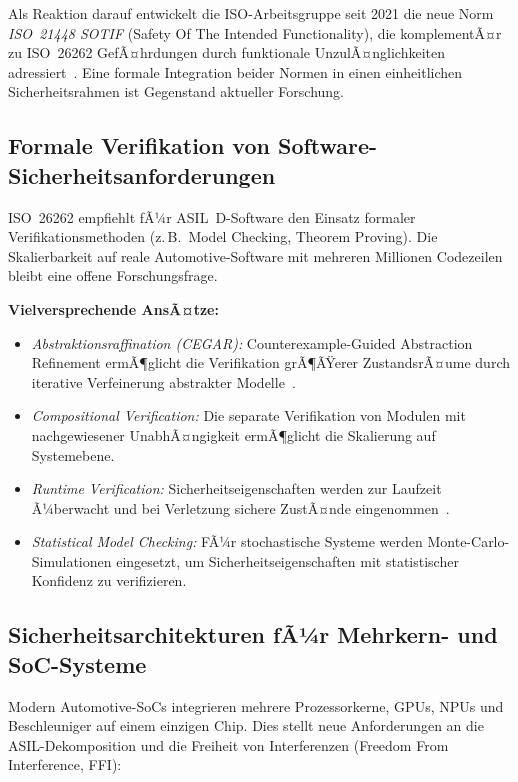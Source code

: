 ﻿\documentclass[a4paper,12pt]{article}
\theoremstyle{definition}
\begin{document}
Als Reaktion darauf entwickelt die ISO-Arbeitsgruppe seit 2021 die
neue Norm \emph{ISO~21448 SOTIF} (Safety Of The Intended
Functionality), die komplementÃ¤r zu ISO~26262 GefÃ¤hrdungen durch
funktionale UnzulÃ¤nglichkeiten adressiert~\cite{iso21448_2022}.
Eine formale Integration beider Normen in einen einheitlichen
Sicherheitsrahmen ist Gegenstand aktueller Forschung.

\subsection{Formale Verifikation von Software-Sicherheitsanforderungen}

ISO~26262 empfiehlt fÃ¼r ASIL~D-Software den Einsatz formaler
Verifikationsmethoden (z.\,B.\ Model Checking, Theorem Proving).
Die Skalierbarkeit auf reale Automotive-Software mit mehreren
Millionen Codezeilen bleibt eine offene Forschungsfrage.

\textbf{Vielversprechende AnsÃ¤tze:}
\begin{itemize}
  \item \emph{Abstraktionsraffination (CEGAR):}
        Counterexample-Guided Abstraction Refinement ermÃ¶glicht
        die Verifikation grÃ¶ÃŸerer ZustandsrÃ¤ume durch iterative
        Verfeinerung abstrakter Modelle~\cite{clarke_2003}.
  \item \emph{Compositional Verification:}
        Die separate Verifikation von Modulen mit nachgewiesener
        UnabhÃ¤ngigkeit ermÃ¶glicht die Skalierung auf Systemebene.
  \item \emph{Runtime Verification:}
        Sicherheitseigenschaften werden zur Laufzeit Ã¼berwacht
        und bei Verletzung sichere ZustÃ¤nde eingenommen~\cite{leucker_2009}.
  \item \emph{Statistical Model Checking:}
        FÃ¼r stochastische Systeme werden Monte-Carlo-Simulationen
        eingesetzt, um Sicherheitseigenschaften mit statistischer
        Konfidenz zu verifizieren.
\end{itemize}

\subsection{Sicherheitsarchitekturen fÃ¼r Mehrkern- und SoC-Systeme}

Modern Automotive-SoCs integrieren mehrere Prozessorkerne, GPUs,
NPUs und Beschleuniger auf einem einzigen Chip. Dies stellt neue
Anforderungen an die ASIL-Dekomposition und die Freiheit von
Interferenzen (Freedom From Interference, FFI):
\end{document}

